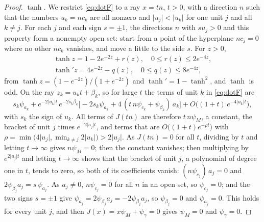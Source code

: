 \documentclass[10pt]{article}
\theoremstyle{definition}
\theoremstyle{remark}
\newenvironment{nested}{\par\nopagebreak\def\FrameCommand{\hspace{0.5em}{\color{black!30}\vrule width 0.6pt}\hspace{1em}}\MakeFramed{\advance\hsize-\width\FrameRestore}}{\endMakeFramed}
\begin{document}
\begin{nested}
\begin{proof}
\emph{$\tanh$.} We restrict \cref{eq:dotF} to a ray $x = tn$, $t > 0$, with a direction $n$ such that the numbers $u_k = nc_k$ are all nonzero and $\lvert u_j\rvert < \lvert u_k\rvert$ for one unit $j$ and all $k \neq j$. For each $j$ and each sign $s = \pm 1$, the directions $n$ with $su_j > 0$ and this property form a nonempty open set: start from a point of the hyperplane $nc_j = 0$ where no other $nc_k$ vanishes, and move a little to the side $s$. For $z > 0$,
\begin{gather*}
\tanh z = 1 - 2e^{-2z} + r(z),\quad 0 \le r(z) \le 2e^{-4z},\\
\tanh' z = 4e^{-2z} - q(z),\quad 0 \le q(z) \le 8e^{-4z},
\end{gather*}
from $\tanh z = (1 - e^{-2z})/(1 + e^{-2z})$ and $\tanh' = 1 - \tanh^2$, and $\tanh$ is odd. On the ray $z_k = u_kt + \beta_k$, so for large $t$ the terms of unit $k$ in \cref{eq:dotF} are
\[
s_k\psi_{a_k} + e^{-2\lvert u_k\rvert t}\,e^{-2s_k\beta_k}\big[-2s_k\psi_{a_k} + 4\,(t\,n\psi_{c_k} + \psi_{\beta_k})\,a_k\big] + O\big((1+t)\,e^{-4\lvert u_k\rvert t}\big),
\]
with $s_k$ the sign of $u_k$. All terms of $J(tn)$ are therefore $t\,n\psi_M$, a constant, the bracket of unit $j$ times $e^{-2\lvert u_j\rvert t}$, and terms that are $O\big((1+t)e^{-\rho t}\big)$ with $\rho = \min\big(4\lvert u_j\rvert, \min_{k\neq j}2\lvert u_k\rvert\big) > 2\lvert u_j\rvert$. As $J(tn) = 0$ for all $t$, dividing by $t$ and letting $t \to \infty$ gives $n\psi_M = 0$; then the constant vanishes; then multiplying by $e^{2\lvert u_j\rvert t}$ and letting $t \to \infty$ shows that the bracket of unit $j$, a polynomial of degree one in $t$, tends to zero, so both of its coefficients vanish: $(n\psi_{c_j})\,a_j = 0$ and $2\psi_{\beta_j}a_j = s\,\psi_{a_j}$. As $a_j \neq 0$, $n\psi_{c_j} = 0$ for all $n$ in an open set, so $\psi_{c_j} = 0$; and the two signs $s = \pm1$ give $\psi_{a_j} = 2\psi_{\beta_j}a_j = -2\psi_{\beta_j}a_j$, so $\psi_{\beta_j} = 0$ and $\psi_{a_j} = 0$. This holds for every unit $j$, and then $J(x) = x\psi_M + \psi_\gamma = 0$ gives $\psi_M = 0$ and $\psi_\gamma = 0$.


\end{proof}
\end{nested}
\end{document}

